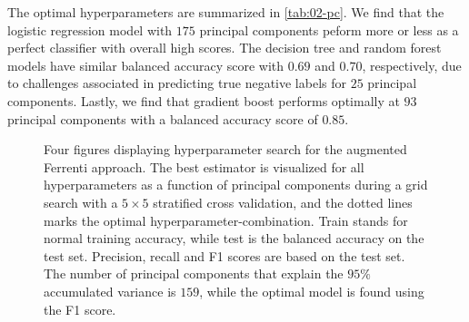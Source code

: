 The optimal hyperparameters are summarized in \autoref{tab:02-pc}. We find that the logistic regression model with $175$ principal components peform more or less as a perfect classifier with overall high scores. The decision tree and random forest models have similar balanced accuracy score with $0.69$ and $0.70$, respectively, due to challenges associated in predicting true negative labels for $25$ principal components. Lastly, we find that gradient boost performs optimally at $93$ principal components with a balanced accuracy score of $0.85$.

\begin{figure}[ht!]
  \begin{subfigure}[b]{1.0\textwidth}
    \centering
    
  \end{subfigure}
\par\bigskip
  \begin{subfigure}[b]{0.5\textwidth}
    
    \caption{}
    \label{fig:q2-LOG}
  \end{subfigure}%
  \hfill
  \begin{subfigure}[b]{0.5\textwidth}
    
    \caption{}
    \label{fig:q2-DT}
  \end{subfigure}

  \begin{subfigure}[b]{0.5\textwidth}
    
    \caption{}
    \label{fig:q2-RF}
  \end{subfigure}%
  \hfill
  \begin{subfigure}[b]{0.5\textwidth}
    
    \caption{}
    \label{fig:q2-GB}
  \end{subfigure}
  \vspace*{-130mm}
  \caption{{Four figures displaying hyperparameter search for the augmented Ferrenti approach. The best estimator is visualized for all hyperparameters as a function of principal components during a grid search with a $5\times5$ stratified cross validation, and the dotted lines marks the optimal hyperparameter-combination. Train stands for normal training accuracy, while test is the balanced accuracy on the test set. Precision, recall and F1 scores are based on the test set. The number of principal components that explain the $95\%$ accumulated variance is $159$, while the optimal model is found using the F1 score.}}
  \label{fig:02-pca}
\end{figure}

